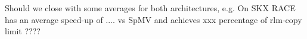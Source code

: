 {\GW Should we close with some averages for both architectures, e.g. On SKX RACE has an average speed-up of .... vs SpMV and achieves xxx percentage of rlm-copy limit ????} 
%
%
